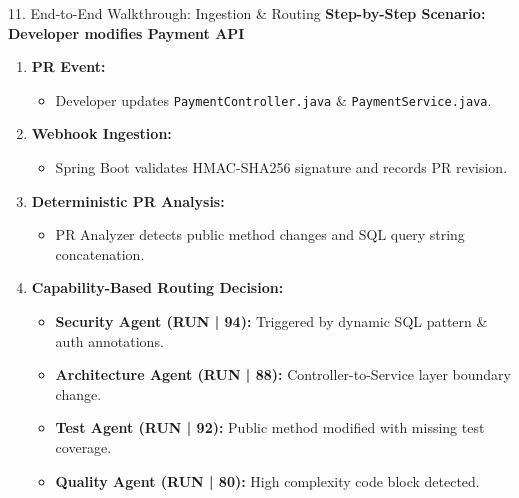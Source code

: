 \documentclass[aspectratio=169,11pt]{beamer}
\begin{document}
\begin{frame}{11. End-to-End Walkthrough: Ingestion \& Routing}
  \textbf{Step-by-Step Scenario: Developer modifies Payment API}
  \vspace{0.25cm}
  \begin{enumerate}
    \item \textbf{PR Event:}
      \begin{itemize}
        \item Developer updates \texttt{PaymentController.java} \& \texttt{PaymentService.java}.
      \end{itemize}
    \vspace{0.15cm}
    \item \textbf{Webhook Ingestion:}
      \begin{itemize}
        \item Spring Boot validates HMAC-SHA256 signature and records PR revision.
      \end{itemize}
    \vspace{0.15cm}
    \item \textbf{Deterministic PR Analysis:}
      \begin{itemize}
        \item PR Analyzer detects public method changes and SQL query string concatenation.
      \end{itemize}
    \vspace{0.15cm}
    \item \textbf{Capability-Based Routing Decision:}
      \begin{itemize}
        \item \textbf{Security Agent (RUN | 94):} Triggered by dynamic SQL pattern \& auth annotations.
        \item \textbf{Architecture Agent (RUN | 88):} Controller-to-Service layer boundary change.
        \item \textbf{Test Agent (RUN | 92):} Public method modified with missing test coverage.
        \item \textbf{Quality Agent (RUN | 80):} High complexity code block detected.
      \end{itemize}
  \end{enumerate}
\end{frame}
\end{document}
